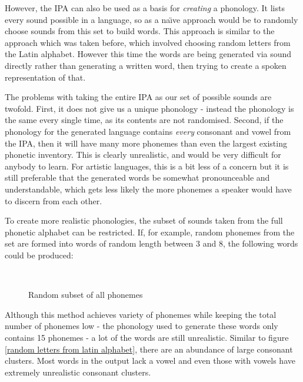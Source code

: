 \documentclass{report}
\begin{document}
	However, the IPA can also be used as a basis for \textit{creating} a phonology. It lists every sound possible in a language, so as a na\"{\i}ve approach would be to randomly choose sounds from this set to build words. This approach is similar to the approach which was taken before, which involved choosing random letters from the Latin alphabet. However this time the words are being generated via sound directly rather than generating a written word, then trying to create a spoken representation of that.
	
	The problems with taking the entire IPA as our set of possible sounds are twofold. First, it does not give us a unique phonology - instead the phonology is the same every single time, as its contents are not randomised. Second, if the phonology for the generated language contains \textit{every} consonant and vowel from the IPA, then it will have many more phonemes than even the largest existing phonetic inventory. This is clearly unrealistic, and would be very difficult for anybody to learn. For artistic languages, this is a bit less of a concern but it is still preferable that the generated words be somewhat pronounceable and understandable, which gets less likely the more phonemes a speaker would have to discern from each other.
	
	To create more realistic phonologies, the subset of sounds taken from the full phonetic alphabet can be restricted. If, for example, random phonemes from the set are formed into words of random length between 3 and 8, the following words could be produced:
	
	\begin{figure}[h]
	\caption{Random subset of all phonemes}
	\label{random subset of all phonemes}	
	\begin{tcolorbox}
		\texttt{
		}
	\end{tcolorbox}
	\end{figure}

	Although this method achieves variety of phonemes while keeping the total number of phonemes low - the phonology used to generate these words only contains 15 phonemes - a lot of the words are still unrealistic. Similar to figure \ref{random letters from latin alphabet}, there are an abundance of large consonant clusters. Most words in the output lack a vowel and even those with vowels have extremely unrealistic consonant clusters.
	
\end{document}
